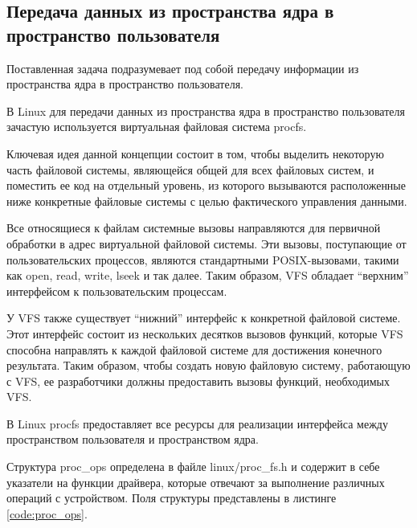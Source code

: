 \subsection{Передача данных из пространства ядра в пространство пользователя}
Поставленная задача подразумевает под собой передачу информации из пространства ядра в пространство пользователя.

В Linux для передачи данных из пространства ядра в пространство пользователя зачастую используется виртуальная файловая система procfs.

Ключевая идея данной концепции состоит в том, чтобы выделить некоторую часть файловой системы, являющейся общей для всех файловых систем, и поместить ее код на отдельный уровень, из которого вызываются расположенные ниже конкретные файловые системы с целью фактического управления данными. \cite{tanenbaum}

Все относящиеся к файлам системные вызовы направляются для первичной обработки в адрес виртуальной файловой системы. Эти вызовы, поступающие от пользовательских процессов, являются стандартными POSIX-вызовами, такими как open, read, write, lseek и так далее. Таким образом, VFS обладает ``верхним'' интерфейсом к пользовательским процессам. \cite{tanenbaum}

У VFS также существует ``нижний'' интерфейс к конкретной файловой системе. Этот интерфейс состоит из нескольких десятков вызовов функций, которые VFS способна направлять к каждой файловой системе для достижения конечного результата. Таким образом, чтобы создать новую файловую систему, работающую с VFS, ее разработчики должны предоставить вызовы функций, необходимых VFS. \cite{tanenbaum}

В Linux procfs предоставляет все ресурсы для реализации интерфейса между пространством пользователя и пространством ядра.

Структура proc\_ops определена в файле linux/proc\_fs.h и содержит в себе указатели на функции драйвера, которые отвечают за выполнение различных операций с устройством. Поля структуры представлены в листинге \ref{code:proc_ops}.


